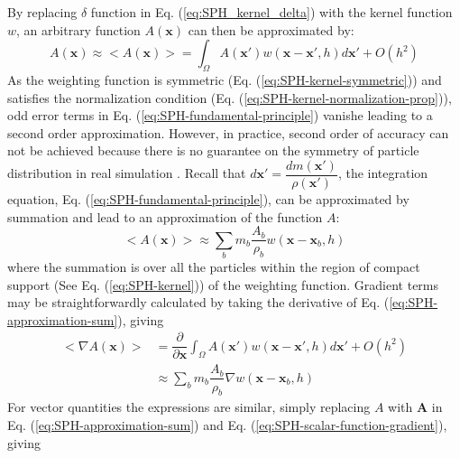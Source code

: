 \documentclass[gmd, manuscript]{copernicus}
\begin{document}
By replacing $\delta$ function in Eq. (\ref{eq:SPH_kernel_delta}) with the kernel function $w$, an arbitrary function $A\left(\textbf{x}\right)$ can then be approximated by:
\begin{equation}
A\left(\textbf{x}\right) \approx <A\left(\textbf{x}\right)> = \int_{\Omega} A\left(\textbf{x} \prime\right) w\left(\textbf{x}-\textbf{x}\prime, h\right) d\textbf{x}\prime + O\left(h^2\right)
\label{eq:SPH-fundamental-principle}
\end{equation}
As the weighting function is symmetric (Eq. (\ref{eq:SPH-kernel-symmetric})) and satisfies the normalization condition (Eq. (\ref{eq:SPH-kernel-normalization-prop})), odd error terms in Eq. (\ref{eq:SPH-fundamental-principle}) vanishe leading to a second order approximation. However, in practice, second order of accuracy can not be achieved because there is no guarantee on the symmetry of particle distribution in real simulation \citep{price2012smoothed}.
Recall that $d\textbf{x}\prime = \dfrac{dm (\textbf{x} \prime)}{\rho (\textbf{x} \prime)}$, the integration equation, Eq. (\ref{eq:SPH-fundamental-principle}), can be approximated by summation and lead to an approximation of the function $A$:
\begin{equation}
<A\left(\textbf{x}\right)> \approx \sum_b m_b \dfrac{A_b}{\rho_b} w\left(\textbf{x}-\textbf{x}_b, h\right)
\label{eq:SPH-approximation-sum}
\end{equation}
where the summation is over all the particles within the region of compact support (See Eq. (\ref{eq:SPH-kernel})) of the weighting function. 
Gradient terms may be straightforwardly calculated by taking the derivative of Eq. (\ref{eq:SPH-approximation-sum}), giving
\begin{equation}
\begin{split}
<\nabla A\left(\textbf{x}\right)> & = \dfrac{\partial }{\partial \textbf{x}} \int_{\Omega} A\left(\textbf{x} \prime\right) w\left(\textbf{x}-\textbf{x}\prime, h\right) d\textbf{x}\prime + O\left(h^2\right) \\
& \approx \sum_b m_b \dfrac{A_b}{\rho_b} \nabla w\left(\textbf{x} - \textbf{x}_b, h\right)
\end{split} 
\label{eq:SPH-scalar-function-gradient}
\end{equation}
For vector quantities the expressions are similar, simply replacing $A$ with $\textbf{A}$ in Eq. (\ref{eq:SPH-approximation-sum}) and Eq. (\ref{eq:SPH-scalar-function-gradient}), giving
\end{document}
